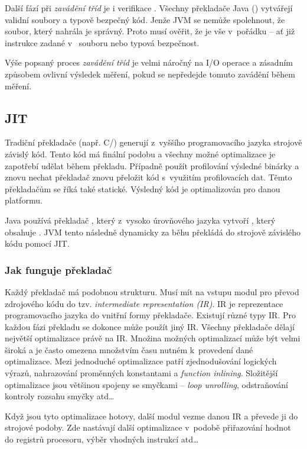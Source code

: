 Další fází při \emph{zavádění tříd} je i verifikace \bytecode{}. Všechny překladače Java (\javac{}) vytvářejí validní \classfile{} soubory a typově bezpečný kód. Jenže JVM se nemůže spolehnout, že soubor, který nahrála je správný. Proto musí ověřit, že je vše v~pořádku -- ať již instrukce zadané v~\classfile{} souboru nebo typová bezpečnost.

Výše popsaný proces \emph{zavádění tříd} je velmi náročný na I/O operace a zásadním způsobem ovlivní výsledek měření, pokud se nepředejde tomuto zavádění během měření.

\subsection{JIT\label{sub:JIT}}
Tradiční překladače (např. C/\CC) generují z~vyššího programovacího jazyka strojově závislý kód. Tento kód má finální podobu a všechny možné optimalizace je zapotřebí udělat během překladu. Případně použít profilování výsledné binárky a znovu nechat překladač znovu přeložit kód s~využitím profilovacích dat. Těmto překladačům se říká také statické. Výsledný kód je optimalizován pro danou platformu.

Java používá překladač \javac{}, který z~vysoko úrovňového jazyka vytvoří \classfile{}, který obsahuje \bytecode{}. JVM tento \bytecode{} následně dynamicky za běhu překládá do strojově závislého kódu pomocí JIT.

\subsubsection{Jak funguje překladač}
Každý překladač má podobnou strukturu.
Musí mít na vstupu modul pro převod zdrojového kódu do tzv. \emph{intermediate representation (IR)}.
IR je reprezentace programovacího jazyka do vnitřní formy překladače.
Existují různé typy IR. Pro každou fázi překladu se dokonce může použít jiný IR.
Všechny překladače dělají největší optimalizace právě na IR.
Množina možných optimalizací může být velmi široká a je často omezena množstvím času nutném k~provedení dané optimalizace.
Mezi jednoduché optimalizace patří zjednodušování logických výrazů, nahrazování proměnných konstantami a \emph{function inlining}.
Složitější optimalizace jsou většinou spojeny se smyčkami -- \emph{loop unrolling}, odstraňování kontroly rozsahu smyčky atd\ldots{}

Když jsou tyto optimalizace hotovy, další modul vezme danou IR a převede ji do strojové podoby. Zde nastávají další optimalizace v~podobě přiřazování hodnot do registrů procesoru, výběr vhodných instrukcí atd\ldots{}

